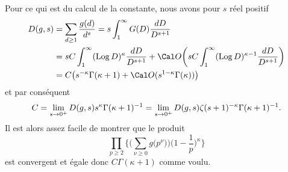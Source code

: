 \bigskip
{}

Pour ce qui est du calcul de la constante, nous avons pour $s$ r\'eel positif
$$
\aligned
D(g,s)
&=\sum_{d\ge1}\frac{g(d)}{d^s}=s\int_1^\infty G(D)\frac{dD}{D^{s+1}}
\\&= s C\int_1^\infty(\Log D)^{\kappa}\frac{dD}{D^{s+1}}
+\Cal O\bigg(
sC\int_1^\infty(\Log D)^{\kappa-1}\frac{dD}{D^{s+1}}
\bigg)
\\&=
C\big(s^{-\kappa}\Gamma(\kappa+1)+\Cal O(s^{1-\kappa}\Gamma(\kappa))\big)
\endaligned
$$
et par cons\'equent
$$
C=\lim_{s\goes0^+} D(g,s)s^{\kappa}\Gamma(\kappa+1)^{-1}
=\lim_{s\goes0^+} D(g,s)\zeta(s+1)^{-\kappa}\Gamma(\kappa+1)^{-1}.
$$
Il est alors assez facile de montrer que le produit
$$
\prod_{p\ge2}\bigg\{
\bigg(\sum_{\nu\ge0}g\big(p^{\nu}\big)\bigg)
\bigg(1-\frac1p\bigg)^{\kappa}\bigg\}
$$
est convergent et \'egale donc $C\Gamma(\kappa+1)$ comme voulu.



